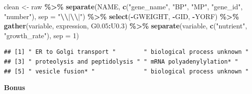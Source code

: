 \documentclass[
]{book}
\newenvironment{Shaded}{\begin{snugshade}}{\end{snugshade}}
\newcommand{\AttributeTok}[1]{\textcolor[rgb]{0.13,0.29,0.53}{#1}}
\newcommand{\DecValTok}[1]{\textcolor[rgb]{0.00,0.00,0.81}{#1}}
\newcommand{\FloatTok}[1]{\textcolor[rgb]{0.00,0.00,0.81}{#1}}
\newcommand{\FunctionTok}[1]{\textcolor[rgb]{0.13,0.29,0.53}{\textbf{#1}}}
\newcommand{\NormalTok}[1]{#1}
\newcommand{\OtherTok}[1]{\textcolor[rgb]{0.56,0.35,0.01}{#1}}
\newcommand{\SpecialCharTok}[1]{\textcolor[rgb]{0.81,0.36,0.00}{\textbf{#1}}}
\newcommand{\StringTok}[1]{\textcolor[rgb]{0.31,0.60,0.02}{#1}}
\begin{document}
\begin{Shaded}
\begin{Highlighting}[]
\NormalTok{clean }\OtherTok{\textless{}{-}}\NormalTok{ raw }\SpecialCharTok{\%\textgreater{}\%}
  \FunctionTok{separate}\NormalTok{(NAME, }\FunctionTok{c}\NormalTok{(}\StringTok{"gene\_name"}\NormalTok{, }\StringTok{"BP"}\NormalTok{, }\StringTok{"MP"}\NormalTok{, }\StringTok{"gene\_id"}\NormalTok{, }\StringTok{"number"}\NormalTok{), }\AttributeTok{sep =} \StringTok{"}\SpecialCharTok{\textbackslash{}\textbackslash{}}\StringTok{|}\SpecialCharTok{\textbackslash{}\textbackslash{}}\StringTok{|"}\NormalTok{) }\SpecialCharTok{\%\textgreater{}\%}
  \FunctionTok{select}\NormalTok{(}\SpecialCharTok{{-}}\NormalTok{GWEIGHT, }\SpecialCharTok{{-}}\NormalTok{GID, }\SpecialCharTok{{-}}\NormalTok{YORF) }\SpecialCharTok{\%\textgreater{}\%}
  \FunctionTok{gather}\NormalTok{(variable, expression, G0}\FloatTok{.05}\SpecialCharTok{:}\NormalTok{U0}\FloatTok{.3}\NormalTok{) }\SpecialCharTok{\%\textgreater{}\%}
  \FunctionTok{separate}\NormalTok{(variable, }\FunctionTok{c}\NormalTok{(}\StringTok{"nutrient"}\NormalTok{, }\StringTok{"growth\_rate"}\NormalTok{), }\AttributeTok{sep =} \DecValTok{1}\NormalTok{)}
\end{Highlighting}
\end{Shaded}

\begin{Shaded}
\end{Shaded}

\begin{verbatim}
## [1] " ER to Golgi transport "        " biological process unknown "  
## [3] " proteolysis and peptidolysis " " mRNA polyadenylylation* "     
## [5] " vesicle fusion* "              " biological process unknown "
\end{verbatim}

\textbf{Bonus}
\end{document}
